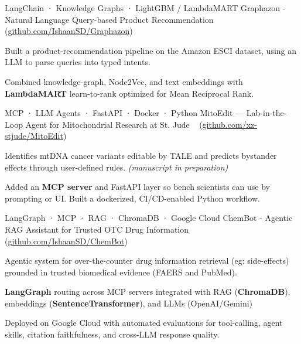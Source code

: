 \documentclass[11pt, a4paper]{awesome-cv}
\begin{document}
\begin{cventries}
    \cventry
    {LangChain · Knowledge Graphs · LightGBM / LambdaMART}
    {Graphazon - Natural Language Query-based Product Recommendation}
    {~}
    {(\href{https://github.com/IshaanSD/Graphazon}{github.com/IshaanSD/Graphazon})}
    {
      \begin{cvitems}
        \item {Built a product-recommendation pipeline on the Amazon ESCI dataset, using an LLM to parse queries into typed intents.}
        \item {Combined knowledge-graph, Node2Vec, and text embeddings with \textbf{LambdaMART} learn-to-rank optimized for Mean Reciprocal Rank.}
      \end{cvitems}
    }

  \cventry
    {MCP · LLM Agents · FastAPI · Docker · Python}
    {MitoEdit — Lab-in-the-Loop Agent for Mitochondrial Research at St. Jude}
    {~}
    {(\href{https://github.com/xz-stjude/MitoEdit}{github.com/xz-stjude/MitoEdit})}
    {
        \begin{cvitems}
            \item {Identifies mtDNA cancer variants editable by TALE and predicts bystander effects through user-defined rules. \textit{(manuscript in preparation)}}
            \item {Added an \textbf{MCP server} and FastAPI layer so bench scientists can use by prompting or UI. Built a dockerized, CI/CD-enabled Python workflow.}
        \end{cvitems}
    }
    
    \cventry
    {LangGraph · MCP · RAG · ChromaDB · Google Cloud}
    {{ChemBot - Agentic RAG Assistant for Trusted OTC Drug Information}}
    {~}
    {(\href{https://github.com/IshaanSD/ChemBot}{github.com/IshaanSD/ChemBot})}
    {
        \begin{cvitems}
            \item {Agentic system for over-the-counter drug information retrieval (eg: side-effects) grounded in trusted biomedical evidence (FAERS and PubMed).}
            \item {\textbf{LangGraph} routing across MCP servers integrated with RAG (\textbf{ChromaDB}), embeddings (\textbf{SentenceTransformer}), and LLMs (OpenAI/Gemini)}
            \item {Deployed on Google Cloud with automated evaluations for tool-calling, agent skills, citation faithfulness, and cross-LLM response quality.}
        \end{cvitems}
    }
    

\end{cventries}
\end{document}
